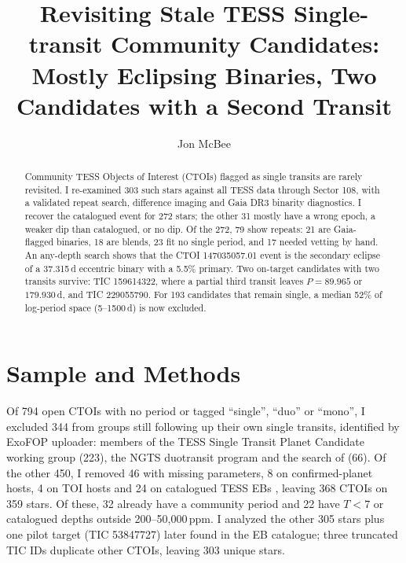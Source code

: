 \documentclass{aastex701}
\begin{document}
\title{Revisiting Stale TESS Single-transit Community Candidates: Mostly Eclipsing Binaries, Two Candidates with a Second Transit}

\author[orcid=0009-0000-7524-4470]{Jon McBee}

\begin{abstract}
Community TESS Objects of Interest (CTOIs) flagged as single transits are rarely revisited.
I re-examined 303 such stars against all TESS data through Sector 108, with a validated repeat
search, difference imaging and Gaia DR3 binarity diagnostics. I recover the catalogued event for 272 stars; the other 31 mostly have a wrong
epoch, a weaker dip than catalogued, or no dip. Of the 272, 79 show repeats: 21 are Gaia-flagged binaries,
18 are blends, 23 fit no single period, and 17 needed vetting by hand. An any-depth search shows that the
CTOI 147035057.01 event is the secondary eclipse of a 37.315\,d eccentric binary
with a 5.5\% primary. Two on-target candidates with two transits survive: TIC 159614322, where a
partial third transit leaves $P=89.965$ or $179.930$\,d, and TIC 229055790. For 193 candidates that
remain single, a median 52\% of log-period space (5--1500\,d) is now excluded.
\end{abstract}


\section{Sample and Methods}

Of 794 open CTOIs with no period or tagged ``single'', ``duo'' or ``mono'', I excluded 344 from
groups still following up their own single transits, identified by ExoFOP uploader: members of the
TESS Single Transit Planet Candidate working group (223), the NGTS duotransit program
\citep[55;][]{Hawthorn2024} and the search of \citet{Salinas2025} (66). Of the other 450, I removed
46 with missing parameters, 8 on confirmed-planet hosts, 4 on TOI hosts and 24 on catalogued TESS
EBs \citep{Prsa2022}, leaving 368 CTOIs on 359 stars. Of these, 32 already have a community period
and 22 have $T<7$ or catalogued depths outside 200--50{,}000\,ppm. I analyzed the other 305 stars
plus one pilot target (TIC 53847727) later found in the EB catalogue; three truncated TIC IDs
duplicate other CTOIs, leaving 303 unique stars.
\end{document}
